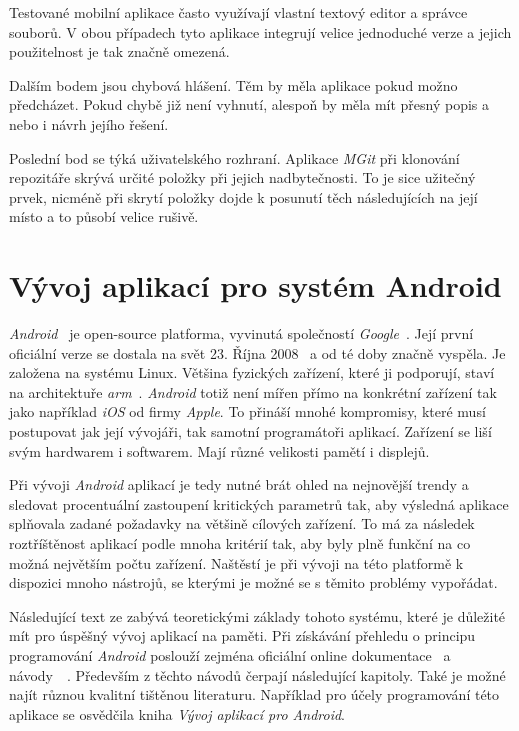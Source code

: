     Testované mobilní aplikace často využívají vlastní textový editor a správce souborů. V obou případech tyto aplikace integrují velice jednoduché verze a jejich použitelnost je tak značně omezená.

    Dalším bodem jsou chybová hlášení. Těm by měla aplikace pokud možno předcházet. Pokud chybě již není vyhnutí, alespoň by měla mít přesný popis a nebo i návrh jejího řešení.

    Poslední bod se týká uživatelského rozhraní. Aplikace \emph{MGit} při klonování repozitáře skrývá určité položky při jejich nadbytečnosti. To je sice užitečný prvek, nicméně při skrytí položky dojde k posunutí těch následujících na její místo a to působí velice rušivě.

\chapter{Vývoj aplikací pro systém Android}
\emph{Android}~ je open-source platforma, vyvinutá společností \emph{Google}~. Její první oficiální verze se dostala na svět 23. Října 2008~ a od té doby značně vyspěla. Je založena na systému Linux. Většina fyzických zařízení, které ji podporují, staví na architektuře \emph{arm}~\cite{ABIs}. \emph{Android} totiž není mířen přímo na konkrétní zařízení tak jako například \emph{iOS} od firmy \emph{Apple}. To přináší mnohé kompromisy, které musí postupovat jak její vývojáři, tak samotní programátoři aplikací. Zařízení se liší svým hardwarem i softwarem. Mají různé velikosti pamětí i displejů.

Při vývoji \emph{Android} aplikací je tedy nutné brát ohled na nejnovější trendy a sledovat procentuální zastoupení kritických parametrů tak, aby výsledná aplikace splňovala zadané požadavky na většině cílových zařízení. To má za následek roztříštěnost aplikací podle mnoha kritérií tak, aby byly plně funkční na co možná největším počtu zařízení. Naštěstí je při vývoji na této platformě k dispozici mnoho nástrojů, se kterými je možné se s těmito problémy vypořádat.

Následující text ze zabývá teoretickými základy tohoto systému, které je důležité mít pro úspěšný vývoj aplikací na paměti. Při získávání přehledu o principu programování \emph{Android} poslouží zejména oficiální online dokumentace~ a návody~~. Především z těchto návodů čerpají následující kapitoly. Také je možné najít různou kvalitní tištěnou literaturu. Například pro účely programování této aplikace se osvědčila kniha \emph{Vývoj aplikací pro Android}\cite{android-Lacko}.

